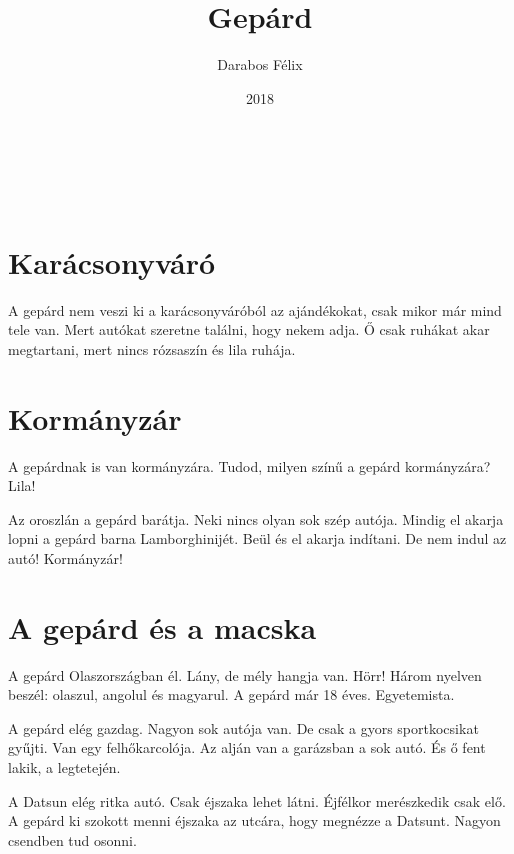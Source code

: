 \documentclass[12pt]{memoir}
\author{Darabos Félix}
\date{2018}
\title{Gepárd}
\newcommand{\image}[1]{%
\incgraph[documentpaper][keepaspectratio=true,width=\paperwidth,height=\paperheight]{#1}}
\begin{document}
\begin{titlingpage}
  \centering
  \vspace*{0.2\textheight}
  {\fontsize{80pt}{96pt}\playfair \thetitle}\\[\baselineskip]
  {\large\theauthor}\\[\baselineskip]
  \vfill
  {\thedate}
  \vspace*{0.1\textheight}
\end{titlingpage}

\pagestyle{plain}


\cleartoverso
\section{Karácsonyváró}
A gepárd nem veszi ki a karácsonyváróból az ajándékokat, csak mikor már mind
tele van. Mert autókat szeretne találni, hogy nekem adja. Ő csak ruhákat akar
megtartani, mert nincs rózsaszín és lila ruhája.
\image{karácsonyváró.png}


\section{Kormányzár}
A gepárdnak is van kormányzára. Tudod, milyen színű a gepárd kormányzára? Lila!

Az oroszlán a gepárd barátja. Neki nincs olyan sok szép autója. Mindig el
akarja lopni a gepárd barna Lamborghinijét. Beül és el akarja indítani. De nem
indul az autó! Kormányzár!


\section{A gepárd és a macska}
A gepárd Olaszországban él. Lány, de mély hangja van. Hörr! Három nyelven
beszél: olaszul, angolul és magyarul. A gepárd már 18 éves. Egyetemista.

A gepárd elég gazdag. Nagyon sok autója van. De csak a gyors sportkocsikat
gyűjti. Van egy felhőkarcolója. Az alján van a garázsban a sok autó. És ő fent
lakik, a legtetején.

A Datsun elég ritka autó. Csak éjszaka lehet látni. Éjfélkor merészkedik csak
elő. A gepárd ki szokott menni éjszaka az utcára, hogy megnézze a Datsunt.
Nagyon csendben tud osonni.
\end{document}
